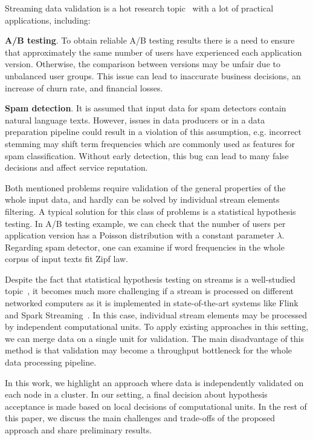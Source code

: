 \label {fs-short-intro}

Streaming data validation is a hot research topic~\cite{Xu:2013:MVS:2488222.2488275, frank2018semantic} with a lot of practical applications, including:

{\bf A/B testing}. To obtain reliable A/B testing results there is a need to ensure that approximately the same number of users have experienced each application version. Otherwise, the comparison between versions may be unfair due to unbalanced user groups. This issue can lead to inaccurate business decisions, an increase of churn rate, and financial losses.
    
{\bf Spam detection}. It is assumed that input data for spam detectors contain natural language texts. However, issues in data producers or in a data preparation pipeline could result in a violation of this assumption, e.g. incorrect stemming may shift term frequencies which are commonly used as features for spam classification. Without early detection, this bug can lead to many false decisions and affect service reputation.

Both mentioned problems require validation of the general properties of the whole input data, and hardly can be solved by individual stream elements filtering. A typical solution for this class of problems is a statistical hypothesis testing. In A/B testing example, we can check that the number of users per application version has a Poisson distribution with a constant parameter $\lambda$. Regarding spam detector, one can examine if word frequencies in the whole corpus of input texts fit Zipf law. 

Despite the fact that statistical hypothesis testing on streams is a well-studied topic~\cite{kifer2004detecting, lall2015data}, it becomes much more challenging if a stream is processed on different networked computers as it is implemented in state-of-the-art systems like Flink~\cite{Carbone:2017:SMA:3137765.3137777} and Spark Streaming~\cite{Zaharia:2012:DSE:2342763.2342773}. In this case, individual stream elements may be processed by independent computational units. To apply existing approaches in this setting, we can merge data on a single unit for validation. The main disadvantage of this method is that validation may become a throughput bottleneck for the whole data processing pipeline. 

In this work, we highlight an approach where data is independently validated on each node in a cluster. In our setting, a final decision about hypothesis acceptance is made based on local decisions of computational units. In the rest of this paper, we discuss the main challenges and trade-offs of the proposed approach and share preliminary results.